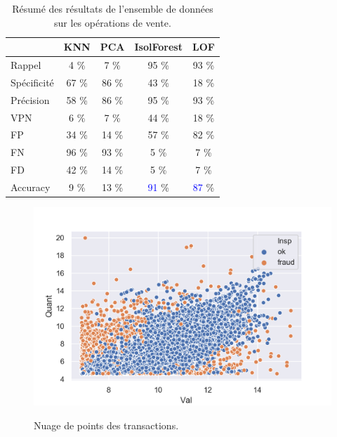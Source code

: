 \begin{table}[H]
\centering
 \begin{tabular}{||l c c c c||} 
 \hline
 &  KNN & PCA & IsolForest & LOF\\ [0.5ex] 
 \hline\hline
Rappel & 4 \% & 7 \%  & 95 \% & 93  \% \\ 
Spécificité & 67 \% & 86 \%  & 43 \% & 18 \% \\
Précision & 58 \% & 86 \%  & 95 \% & 93 \% \\
VPN & 6 \% & 7 \%  & 44 \% & 18 \% \\
FP & 34 \% & 14 \%  & 57 \% & 82 \% \\
FN & 96 \% & 93 \%  & 5 \% & 7 \% \\
FD & 42 \% & 14 \%  & 5 \% & 7 \% \\
Accuracy & 9 \% & 13 \%  & \textcolor{blue}{91} \% & \textcolor{blue}{87} \% \\
[1ex] 
 \hline
 \end{tabular}
 \caption{Résumé des résultats de l'ensemble de données sur les opérations de vente.}
 \label{fig_sale3}
\end{table}

\begin{figure}[H]
    \centering
    \includegraphics[width=.5\textwidth]{ADOA/Images/salescatter.png}
    \label{fig_sal11}
    \caption{Nuage de points des transactions.}%
\end{figure}

